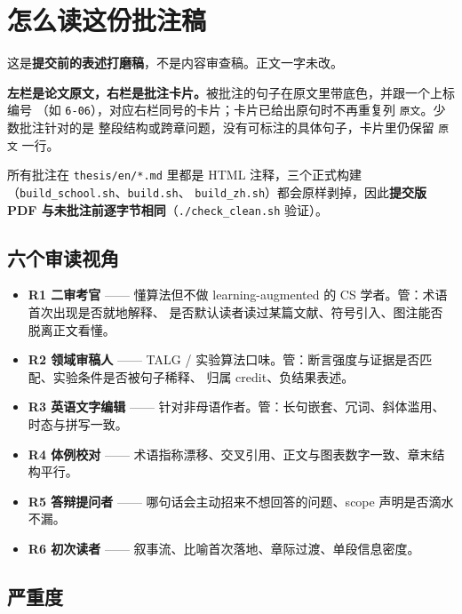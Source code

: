 \chapter*{怎么读这份批注稿}\label{ux600eux4e48ux8bfbux8fd9ux4efdux6279ux6ce8ux7a3f}

这是\textbf{提交前的表述打磨稿}，不是内容审查稿。正文一字未改。

\textbf{左栏是论文原文，右栏是批注卡片。}被批注的句子在原文里带底色，并跟一个上标编号
（如 \texttt{6-06}），对应右栏同号的卡片；卡片已给出原句时不再重复列
\texttt{原文}。少数批注针对的是
整段结构或跨章问题，没有可标注的具体句子，卡片里仍保留 \texttt{原文}
一行。

所有批注在 \texttt{thesis/en/*.md} 里都是 HTML
注释，三个正式构建（\texttt{build\_school.sh}、\texttt{build.sh}、
\texttt{build\_zh.sh}）都会原样剥掉，因此\textbf{提交版 PDF
与未批注前逐字节相同}（\texttt{./check\_clean.sh} 验证）。

\section*{六个审读视角}\label{ux516dux4e2aux5ba1ux8bfbux89c6ux89d2}

\begin{itemize}
\tightlist
\item
  \textbf{R1 二审考官} ------ 懂算法但不做 learning-augmented 的 CS
  学者。管：术语首次出现是否就地解释、
  是否默认读者读过某篇文献、符号引入、图注能否脱离正文看懂。
\item
  \textbf{R2 领域审稿人} ------ TALG /
  实验算法口味。管：断言强度与证据是否匹配、实验条件是否被句子稀释、
  归属 credit、负结果表述。
\item
  \textbf{R3 英语文字编辑} ------
  针对非母语作者。管：长句嵌套、冗词、斜体滥用、时态与拼写一致。
\item
  \textbf{R4 体例校对} ------
  术语指称漂移、交叉引用、正文与图表数字一致、章末结构平行。
\item
  \textbf{R5 答辩提问者} ------ 哪句话会主动招来不想回答的问题、scope
  声明是否滴水不漏。
\item
  \textbf{R6 初次读者} ------
  叙事流、比喻首次落地、章际过渡、单段信息密度。
\end{itemize}

\section*{严重度}\label{ux4e25ux91cdux5ea6}

